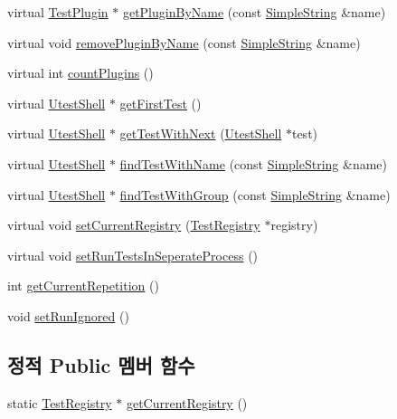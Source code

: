\begin{DoxyCompactItemize}
\item 
virtual \hyperlink{class_test_plugin}{Test\+Plugin} $\ast$ \hyperlink{class_test_registry_a51f70cec62bf873bdae6cc7514437343}{get\+Plugin\+By\+Name} (const \hyperlink{class_simple_string}{Simple\+String} \&name)
\item 
virtual void \hyperlink{class_test_registry_ab73c2d4f989d252345dc4057e340b32f}{remove\+Plugin\+By\+Name} (const \hyperlink{class_simple_string}{Simple\+String} \&name)
\item 
virtual int \hyperlink{class_test_registry_a89fd9df327370859aa9fb6174e68efe3}{count\+Plugins} ()
\item 
virtual \hyperlink{class_utest_shell}{Utest\+Shell} $\ast$ \hyperlink{class_test_registry_a6a54bf69213aff1178ae5ed7e391e294}{get\+First\+Test} ()
\item 
virtual \hyperlink{class_utest_shell}{Utest\+Shell} $\ast$ \hyperlink{class_test_registry_a6936b1506a4c7b70dcaca8b68edd8a60}{get\+Test\+With\+Next} (\hyperlink{class_utest_shell}{Utest\+Shell} $\ast$test)
\item 
virtual \hyperlink{class_utest_shell}{Utest\+Shell} $\ast$ \hyperlink{class_test_registry_abc44878e523d9f592c73417041eacd80}{find\+Test\+With\+Name} (const \hyperlink{class_simple_string}{Simple\+String} \&name)
\item 
virtual \hyperlink{class_utest_shell}{Utest\+Shell} $\ast$ \hyperlink{class_test_registry_a6184f9d97c071edc479f8285eb455c8b}{find\+Test\+With\+Group} (const \hyperlink{class_simple_string}{Simple\+String} \&name)
\item 
virtual void \hyperlink{class_test_registry_a1457065859f3c516becd9e9772abf081}{set\+Current\+Registry} (\hyperlink{class_test_registry}{Test\+Registry} $\ast$registry)
\item 
virtual void \hyperlink{class_test_registry_a21358b05d43e4db04bc771bbfcfb5712}{set\+Run\+Tests\+In\+Seperate\+Process} ()
\item 
int \hyperlink{class_test_registry_a98aa9e0094990df470ad354d9d5a71ec}{get\+Current\+Repetition} ()
\item 
void \hyperlink{class_test_registry_a861854e4e01f41f5bcc490a0dc0621b0}{set\+Run\+Ignored} ()
\end{DoxyCompactItemize}
\subsection*{정적 Public 멤버 함수}
\begin{DoxyCompactItemize}
\item 
static \hyperlink{class_test_registry}{Test\+Registry} $\ast$ \hyperlink{class_test_registry_ac5922b023ea5c5d83af9c4e1d354731a}{get\+Current\+Registry} ()
\end{DoxyCompactItemize}
